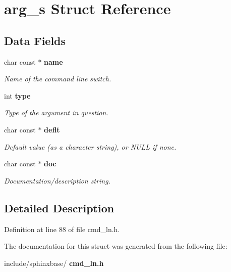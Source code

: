 \section{arg\+\_\+s Struct Reference}
\label{structarg__s}
\subsection*{Data Fields}
\begin{DoxyCompactItemize}
\item 
\mbox{\label{structarg__s_ac6c8fb7dc57cf2df9720cf96535043f9}} 
char const  $\ast$ \textbf{ name}
\begin{DoxyCompactList}\small\item\em Name of the command line switch. \end{DoxyCompactList}\item 
\mbox{\label{structarg__s_ad19743ceba37f2af159b255306bb8920}} 
int \textbf{ type}
\begin{DoxyCompactList}\small\item\em Type of the argument in question. \end{DoxyCompactList}\item 
\mbox{\label{structarg__s_ab975459159f873ee06012460d16819c7}} 
char const  $\ast$ \textbf{ deflt}
\begin{DoxyCompactList}\small\item\em Default value (as a character string), or N\+U\+LL if none. \end{DoxyCompactList}\item 
\mbox{\label{structarg__s_a706be2e230dea293579e4b03043550c0}} 
char const  $\ast$ \textbf{ doc}
\begin{DoxyCompactList}\small\item\em Documentation/description string. \end{DoxyCompactList}\end{DoxyCompactItemize}


\subsection{Detailed Description}


Definition at line 88 of file cmd\+\_\+ln.\+h.



The documentation for this struct was generated from the following file\+:\begin{DoxyCompactItemize}
\item 
include/sphinxbase/\textbf{ cmd\+\_\+ln.\+h}\end{DoxyCompactItemize}
